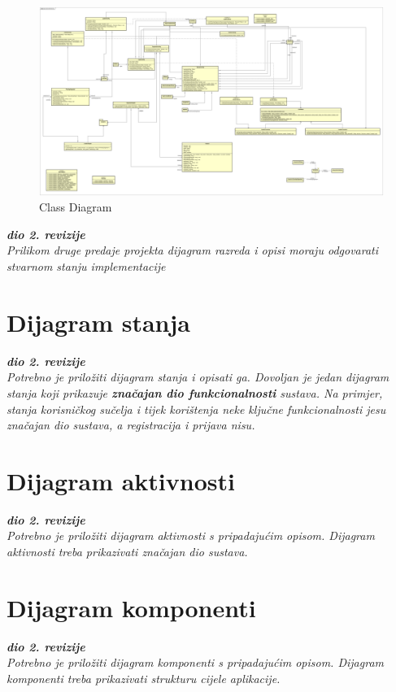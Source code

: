 			\begin{figure}[H]
				\includegraphics[width=\linewidth]{diagrams/UML-OrganizationOfTheFestival_v1.png}
				\caption{Class Diagram}
				\label{fig:class_diag}
			\end{figure}
			
			\textbf{\textit{dio 2. revizije}}\\			
			
			\textit{Prilikom druge predaje projekta dijagram razreda i opisi moraju odgovarati stvarnom stanju implementacije}
			
			
			
			\eject
		
		\section{Dijagram stanja}
			
			
			\textbf{\textit{dio 2. revizije}}\\
			
			\textit{Potrebno je priložiti dijagram stanja i opisati ga. Dovoljan je jedan dijagram stanja koji prikazuje \textbf{značajan dio funkcionalnosti} sustava. Na primjer, stanja korisničkog sučelja i tijek korištenja neke ključne funkcionalnosti jesu značajan dio sustava, a registracija i prijava nisu. }
			
			
			\eject 
		
		\section{Dijagram aktivnosti}
			
			\textbf{\textit{dio 2. revizije}}\\
			
			 \textit{Potrebno je priložiti dijagram aktivnosti s pripadajućim opisom. Dijagram aktivnosti treba prikazivati značajan dio sustava.}
			
			\eject
		\section{Dijagram komponenti}
		
			\textbf{\textit{dio 2. revizije}}\\
		
			 \textit{Potrebno je priložiti dijagram komponenti s pripadajućim opisom. Dijagram komponenti treba prikazivati strukturu cijele aplikacije.}